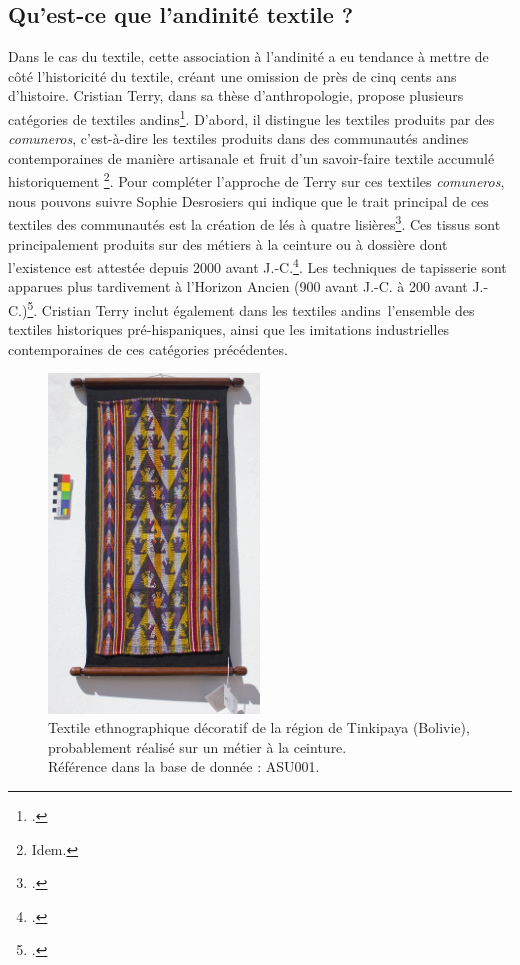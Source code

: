 \subsection{Qu'est-ce que l'\og andinité \fg \:textile ?}

Dans le cas du textile, cette association à l'andinité a eu tendance à mettre de côté l'historicité du textile, créant une omission de près de cinq cents ans d'histoire. Cristian Terry, dans sa thèse d'anthropologie, propose plusieurs catégories de textiles \og andins\fg\footcite[p.~154]{terryTisserValeurAu2019}. D'abord, il distingue les textiles produits par des \textit{comuneros}, c'est-à-dire les textiles produits dans des communautés andines contemporaines de manière artisanale et fruit d'un \og savoir-faire textile accumulé historiquement \fg\footnote{Idem.}. Pour compléter l'approche de Terry sur ces textiles \textit{comuneros}, nous pouvons suivre Sophie Desrosiers qui indique que le trait principal de ces textiles des communautés est la création de lés à quatre lisières\footcite[p.~267 et communication personnelle.]{desrosiersTechniquesTissageOntelles2010}. Ces tissus sont principalement produits sur des métiers à la ceinture ou à dossière dont l'existence est attestée depuis 2000 avant J.-C.\footcite[p.~190]{cousinRobeFemmeOrigine2016}. Les techniques de tapisserie sont apparues plus tardivement à l'Horizon Ancien (900 avant J.-C. à 200 avant J.-C.)\footcite[p.~58]{desrosiersMatieresPremieresSavoirs2018}.
Cristian Terry inclut également dans les textiles \og andins\fg\ \:l'ensemble des textiles historiques pré-hispaniques, ainsi que les imitations industrielles contemporaines de ces catégories précédentes.

\begin{figure}
    \centering
    \includegraphics[width=0.5\textwidth]{../images/ASU001.jpg}
    \caption{Textile ethnographique décoratif de la région de Tinkipaya (Bolivie), probablement réalisé sur un métier à la ceinture. \\ Référence dans la base de donnée : ASU001.}
    \label{fig:ASU001}
\end{figure}

